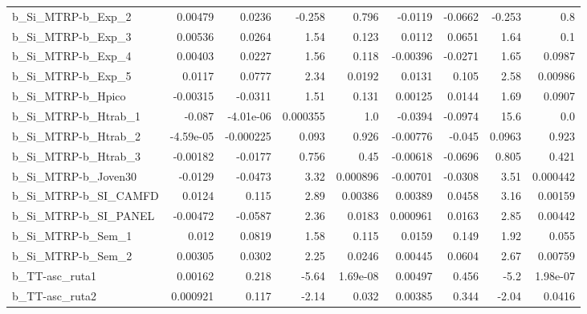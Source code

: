 \begin{tabular}{lrrrrrrrr}
b\_Si\_MTRP-b\_Exp\_2          &     0.00479 &       0.0236 &    -0.258 &    0.796 &    -0.0119 &     -0.0662 &       -0.253 &           0.8 \\
b\_Si\_MTRP-b\_Exp\_3          &     0.00536 &       0.0264 &      1.54 &    0.123 &     0.0112 &      0.0651 &         1.64 &           0.1 \\
b\_Si\_MTRP-b\_Exp\_4          &     0.00403 &       0.0227 &      1.56 &    0.118 &   -0.00396 &     -0.0271 &         1.65 &        0.0987 \\
b\_Si\_MTRP-b\_Exp\_5          &      0.0117 &       0.0777 &      2.34 &   0.0192 &     0.0131 &       0.105 &         2.58 &       0.00986 \\
b\_Si\_MTRP-b\_Hpico          &    -0.00315 &      -0.0311 &      1.51 &    0.131 &    0.00125 &      0.0144 &         1.69 &        0.0907 \\
b\_Si\_MTRP-b\_Htrab\_1        &      -0.087 &    -4.01e-06 &  0.000355 &      1.0 &    -0.0394 &     -0.0974 &         15.6 &           0.0 \\
b\_Si\_MTRP-b\_Htrab\_2        &   -4.59e-05 &    -0.000225 &     0.093 &    0.926 &   -0.00776 &      -0.045 &       0.0963 &         0.923 \\
b\_Si\_MTRP-b\_Htrab\_3        &    -0.00182 &      -0.0177 &     0.756 &     0.45 &   -0.00618 &     -0.0696 &        0.805 &         0.421 \\
b\_Si\_MTRP-b\_Joven30        &     -0.0129 &      -0.0473 &      3.32 & 0.000896 &   -0.00701 &     -0.0308 &         3.51 &      0.000442 \\
b\_Si\_MTRP-b\_SI\_CAMFD       &      0.0124 &        0.115 &      2.89 &  0.00386 &    0.00389 &      0.0458 &         3.16 &       0.00159 \\
b\_Si\_MTRP-b\_SI\_PANEL       &    -0.00472 &      -0.0587 &      2.36 &   0.0183 &   0.000961 &      0.0163 &         2.85 &       0.00442 \\
b\_Si\_MTRP-b\_Sem\_1          &       0.012 &       0.0819 &      1.58 &    0.115 &     0.0159 &       0.149 &         1.92 &         0.055 \\
b\_Si\_MTRP-b\_Sem\_2          &     0.00305 &       0.0302 &      2.25 &   0.0246 &    0.00445 &      0.0604 &         2.67 &       0.00759 \\
b\_TT-asc\_ruta1             &     0.00162 &        0.218 &     -5.64 & 1.69e-08 &    0.00497 &       0.456 &         -5.2 &      1.98e-07 \\
b\_TT-asc\_ruta2             &    0.000921 &        0.117 &     -2.14 &    0.032 &    0.00385 &       0.344 &        -2.04 &        0.0416 \\

\end{tabular}
